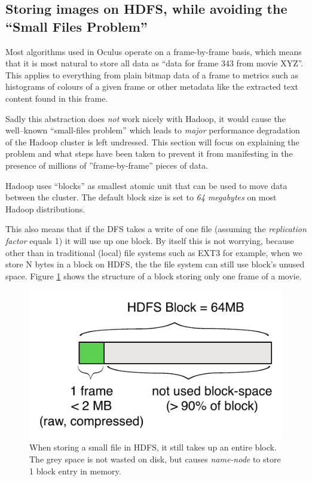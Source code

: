 \subsection{Storing images on HDFS, while avoiding the ``Small Files Problem''}
\label{sec:sequence-files}
Most algorithms used in Oculus operate on a frame-by-frame basis, which means that it is most natural to store all data as ``data for frame 343 from movie XYZ''. This applies to everything from plain bitmap data of a frame to metrics such as histograms of colours of a given frame or other metadata like the extracted text content found in this frame.

Sadly this abstraction does \textit{not} work nicely with Hadoop, it would cause the well--known ``small-files problem'' which leads to \textit{major} performance degradation of the Hadoop cluster is left undressed. This section will focus on explaining the problem and what steps have been taken to prevent it from manifesting in the presence of millions of ''frame-by-frame'' pieces of data.

Hadoop uses ``blocks'' as smallest atomic unit that can be used to move data between the cluster.
The default block size is set to \textit{64 megabytes} on most Hadoop distributions.

This also means that if the DFS takes a write of one file (assuming the \textit{replication factor} equals 1) it will use up one block. By itself this is not worrying, because other than in traditional (local) file systems such as EXT3 for example, when we store N bytes in a block on HDFS,
the the file system can still use block's unused space. Figure \ref{fig:no-sequence-file} shows the structure of a block storing only one frame of a movie.

\begin{figure}[ch!]
  \centering
  \includegraphics[scale=0.9]{diagrams/no-sequence-file.pdf}
  \caption{When storing a small file in HDFS, it still takes up an entire block. The grey space is not wasted on disk, but causes \textit{name-node} to store 1 block entry in memory.}
  \label{fig:no-sequence-file}
\end{figure}

